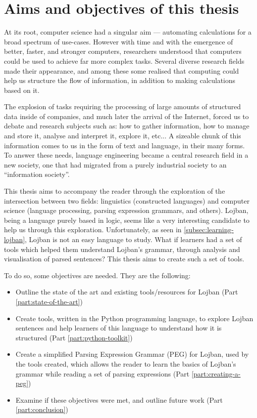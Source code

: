 \chapter{Aims and objectives of this thesis}

\vspace{0.5cm}

At its root, computer science had a singular aim --- automating calculations for a broad spectrum of use-cases.
However with time and with the emergence of better, faster, and stronger computers, researchers understood that computers could be used to achieve
far more complex tasks. Several diverse research fields made their appearance, and among these some realised that computing could help us structure the
flow of information, in addition to making calculations based on it. \newline

The explosion of tasks requiring the processing of large amounts of structured data inside of companies, and much later the arrival of the Internet,
forced us to debate and research subjects such as: how to gather information, how to manage and store it, analyse and interpret it, explore it, etc...
A sizeable chunk of this information comes to us in the form of text and language, in their many forms. To answer these needs, language engineering became a
central research field in a new society, one that had migrated from a purely industrial society to an ``information society''.\newline

This thesis aims to accompany the reader through the exploration of the intersection between two fields: linguistics (constructed languages)
and computer science (language processing, parsing expression grammars, and others). Lojban, being a language purely based in logic, seems like a very
interesting candidate to help us through this exploration. Unfortunately, as seen in \ref{subsec:learning-lojban}, Lojban is not an easy language to study.
What if learners had a set of tools which helped them understand Lojban's grammar, through analysis and visualisation of parsed sentences?
This thesis aims to create such a set of tools.\newline

\newpage

To do so, some objectives are needed. They are the following:
\begin{itemize}
\item Outline the state of the art and existing tools/resources for Lojban (Part \ref{part:state-of-the-art})
\item Create tools, written in the Python programming language, to explore Lojban sentences and help learners of this
language to understand how it is structured (Part \ref{part:python-toolkit})
\item Create a simplified Parsing Expression Grammar (PEG) for Lojban, used by the tools created,
which allows the reader to learn the basics of Lojban's grammar while reading a set of parsing expressions (Part \ref{part:creating-a-peg})
\item Examine if these objectives were met, and outline future work (Part \ref{part:conclusion})
\end{itemize}